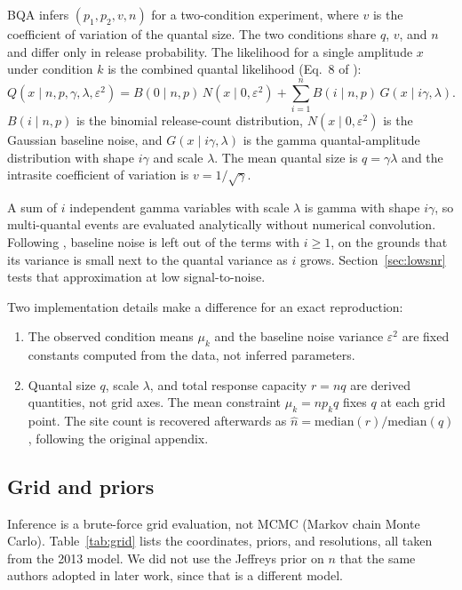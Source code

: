 \documentclass[a4paper, oneside, 10pt]{article}
\renewcommand{\citet}[1]{\citeauthor{#1}\supercite{#1}}
\begin{document}
BQA infers \((p_1, p_2, v, n)\) for a two-condition experiment, where \(v\) is the coefficient of variation of the quantal size. The two conditions share \(q\), \(v\), and \(n\) and differ only in release probability. The likelihood for a single amplitude \(x\) under condition \(k\) is the combined quantal likelihood (Eq.~8 of \citet{bhumbra2013}):
\[
Q(x \mid n, p, \gamma, \lambda, \varepsilon^2) = B(0 \mid n, p)\, N(x \mid 0, \varepsilon^2) + \sum_{i=1}^{n} B(i \mid n, p)\, G(x \mid i\gamma, \lambda).
\]
$B(i \mid n, p)$ is the binomial release-count distribution, $N(x \mid 0, \varepsilon^2)$ is the Gaussian baseline noise, and $G(x \mid i\gamma, \lambda)$ is the gamma quantal-amplitude distribution with shape $i\gamma$ and scale $\lambda$. The mean quantal size is $q = \gamma\lambda$ and the intrasite coefficient of variation is $v = 1/\sqrt{\gamma}$.

A sum of $i$ independent gamma variables with scale $\lambda$ is gamma with shape $i\gamma$, so multi-quantal events are evaluated analytically without numerical convolution. Following \citet{bhumbra2013}, baseline noise is left out of the terms with $i \ge 1$, on the grounds that its variance is small next to the quantal variance as $i$ grows. Section~\ref{sec:lowsnr} tests that approximation at low signal-to-noise.

Two implementation details make a difference for an exact reproduction:

\begin{enumerate}
    \item The observed condition means $\mu_k$ and the baseline noise variance $\varepsilon^2$ are fixed constants computed from the data, not inferred parameters.
    \item Quantal size $q$, scale $\lambda$, and total response capacity $r = nq$ are derived quantities, not grid axes. The mean constraint $\mu_k = n p_k q$ fixes $q$ at each grid point. The site count is recovered afterwards as $\hat{n} = \mathrm{median}(r) / \mathrm{median}(q)$, following the original appendix.
\end{enumerate}

\subsection{Grid and priors}

Inference is a brute-force grid evaluation, not MCMC (Markov chain Monte Carlo). Table~\ref{tab:grid} lists the coordinates, priors, and resolutions, all taken from the 2013 model. We did not use the Jeffreys prior on \(n\) that the same authors adopted in later work, since that is a different model.
\end{document}

